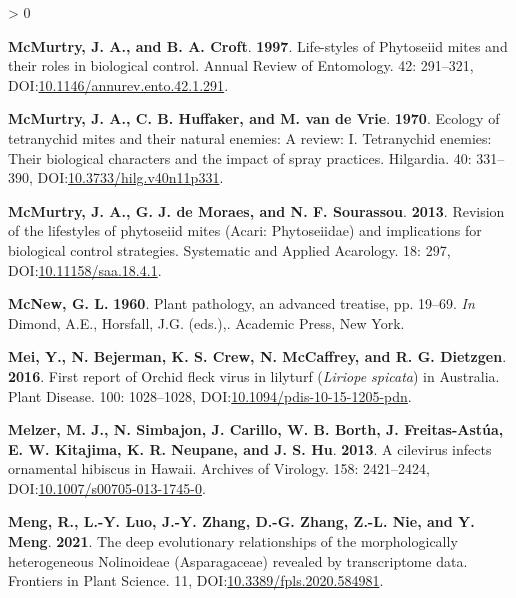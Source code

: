 \documentclass{ufdissertation}[overrideChapters] %
\newlength{\cslhangindent}
\newenvironment{CSLReferences}[2] %
 {%
  \setlength{\parindent}{0pt}
  \ifodd #1 \everypar{\setlength{\hangindent}{\cslhangindent}}\ignorespaces\fi
  \ifnum #2 > 0
  \setlength{\parskip}{#2\baselineskip}
  \fi
 }%
 {}
\begin{document}
{\begin{CSLReferences}{1}{1}
\leavevmode{}%
\textbf{McMurtry, J. A., and B. A. Croft}. \textbf{1997}. Life-styles of {Phytoseiid} mites and their roles in biological control. Annual Review of Entomology. 42: 291--321, DOI:\href{https://doi.org/10.1146/annurev.ento.42.1.291}{10.1146/annurev.ento.42.1.291}.

\leavevmode{}%
\textbf{McMurtry, J. A., C. B. Huffaker, and M. van de Vrie}. \textbf{1970}. Ecology of tetranychid mites and their natural enemies: A review: I. Tetranychid enemies: Their biological characters and the impact of spray practices. Hilgardia. 40: 331--390, DOI:\href{https://doi.org/10.3733/hilg.v40n11p331}{10.3733/hilg.v40n11p331}.

\leavevmode{}%
\textbf{McMurtry, J. A., G. J. de Moraes, and N. F. Sourassou}. \textbf{2013}. Revision of the lifestyles of phytoseiid mites ({Acari}: {Phytoseiidae}) and implications for biological control strategies. Systematic and Applied Acarology. 18: 297, DOI:\href{https://doi.org/10.11158/saa.18.4.1}{10.11158/saa.18.4.1}.

\leavevmode{}%
\textbf{McNew, G. L.} \textbf{1960}. Plant pathology, an advanced treatise, pp. 19--69. \emph{In} Dimond, A.E., Horsfall, J.G. (eds.),. Academic Press, New York.

\leavevmode{}%
\textbf{Mei, Y., N. Bejerman, K. S. Crew, N. McCaffrey, and R. G. Dietzgen}. \textbf{2016}. First report of {Orchid fleck virus} in lilyturf {(\emph{Liriope spicata})} in {Australia}. Plant Disease. 100: 1028--1028, DOI:\href{https://doi.org/10.1094/pdis-10-15-1205-pdn}{10.1094/pdis-10-15-1205-pdn}.

\leavevmode{}%
\textbf{Melzer, M. J., N. Simbajon, J. Carillo, W. B. Borth, J. Freitas-Astúa, E. W. Kitajima, K. R. Neupane, and J. S. Hu}. \textbf{2013}. A cilevirus infects ornamental hibiscus in {Hawaii}. Archives of Virology. 158: 2421--2424, DOI:\href{https://doi.org/10.1007/s00705-013-1745-0}{10.1007/s00705-013-1745-0}.

\leavevmode{}%
\textbf{Meng, R., L.-Y. Luo, J.-Y. Zhang, D.-G. Zhang, Z.-L. Nie, and Y. Meng}. \textbf{2021}. The deep evolutionary relationships of the morphologically heterogeneous {Nolinoideae} ({Asparagaceae}) revealed by transcriptome data. Frontiers in Plant Science. 11, DOI:\href{https://doi.org/10.3389/fpls.2020.584981}{10.3389/fpls.2020.584981}.


\end{CSLReferences}}
\end{document}
